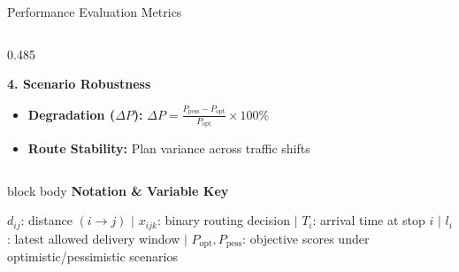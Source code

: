 \documentclass[aspectratio=169,10pt]{beamer}
\begin{document}
\begin{frame}{Performance Evaluation Metrics}
\begin{columns}[T,totalwidth=\textwidth]
\begin{column}{0.485\textwidth}
        \vspace{0.22cm}

        {\bfseries\color{Primary}\small 4. Scenario Robustness}
        \par\vspace{0.04cm}
        \begin{itemize}
            \setlength{\itemsep}{3pt}
            \scriptsize
            \item \textbf{Degradation ($\Delta P$):} $\Delta P = \frac{P_{\text{pess}} - P_{\text{opt}}}{P_{\text{opt}}} \times 100\%$
            \item \textbf{Route Stability:} Plan variance across traffic shifts
        \end{itemize}

    \end{column}

\end{columns}

\vspace{0.2cm}

\begin{beamercolorbox}[rounded=true,shadow=false,wd=\linewidth,sep=4.5pt]{block body}
    {\bfseries\color{Primary}\scriptsize Notation \& Variable Key}\par\vspace{0.03cm}
    \tiny\color{Dark}
    $d_{ij}$: distance $(i \to j)$ \quad$\vert$\quad 
    $x_{ijk}$: binary routing decision \quad$\vert$\quad 
    $T_i$: arrival time at stop $i$ \quad$\vert$\quad 
    $l_i$: latest allowed delivery window \quad$\vert$\quad 
    $P_{\text{opt}}, P_{\text{pess}}$: objective scores under optimistic/pessimistic scenarios
\end{beamercolorbox}

\end{frame}

\end{document}
